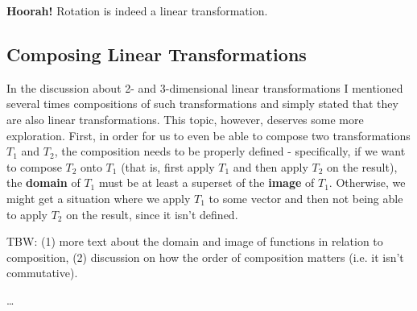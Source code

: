 \textcolor{xred}{\textbf{Hoorah!}} Rotation is indeed a linear transformation.



\subsection{Composing Linear Transformations}
In the discussion about 2- and 3-dimensional linear transformations I mentioned several times compositions of such transformations and simply stated that they are also linear transformations. This topic, however, deserves some more exploration. First, in order for us to even be able to compose two transformations $T_{1}$ and $T_{2}$, the composition needs to be properly defined - specifically, if we want to compose $T_{2}$ onto $T_{1}$ (that is, first apply $T_{1}$ and then apply $T_{2}$ on the result), the \textbf{domain} of $T_{1}$ must be at least a superset of the \textbf{image} of $T_{1}$. Otherwise, we might get a situation where we apply $T_{1}$ to some vector and then not being able to apply $T_{2}$ on the result, since it isn't defined.

TBW: (1) more text about the domain and image of functions in relation to composition, (2) discussion on how the order of composition matters (i.e. it isn't commutative).

\dots

